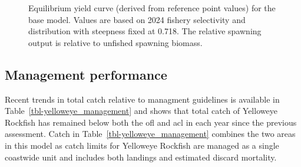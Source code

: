 \documentclass[
]{scrartcl}
\begin{document}
\begin{figure}


\caption{\label{fig-eq-yield-es}Equilibrium yield curve (derived from
reference point values) for the base model. Values are based on 2024
fishery selectivity and distribution with steepness fixed at 0.718. The
relative spawning output is relative to unfished spawning biomass.}

\end{figure}%

\clearpage

\subsection*{Management performance}\label{management-performance}

Recent trends in total catch relative to managment guidelines is
available in Table~\ref{tbl-yelloweye_management} and shows that total
catch of Yelloweye Rockfish has remained below both the \gls{ofl} and
\gls{acl} in each year since the previous assessment. Catch in
Table~\ref{tbl-yelloweye_management} combines the two areas in this
model as catch limits for Yelloweye Rockfish are managed as a single
coastwide unit and includes both landings and estimated discard
mortality.

\begingroup
\fontsize{9.0pt}{10.8pt}\selectfont
\end{document}
